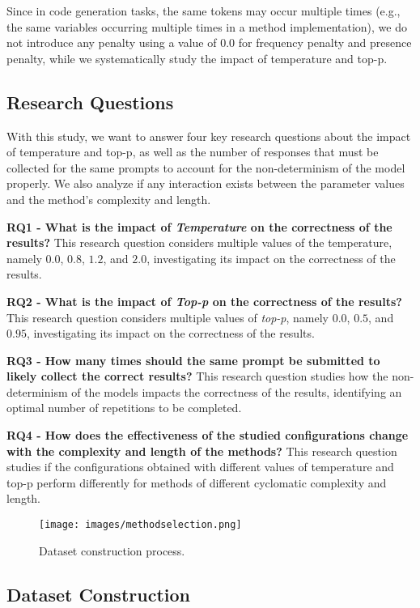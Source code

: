 Since in code generation tasks, the same tokens may occur multiple times (e.g., the same variables occurring multiple times in a method implementation), we do not introduce any penalty using a value of $0.0$ for frequency penalty and presence penalty, while we systematically study the impact of temperature and top-p.

\subsection{Research Questions} \label{sec:rq}

With this study, we want to answer four key research questions about the impact of temperature and top-p, as well as the number of responses that must be collected for the same prompts to account for the non-determinism of the model properly. We also analyze if any interaction exists between the parameter values and the method's complexity and length.

\textbf{RQ1 - What is the impact of \emph{Temperature} on the correctness of the results?} This research question considers multiple values of the temperature, namely $0.0$, $0.8$, $1.2$, and $2.0$, investigating its impact on the correctness of the results.

\textbf{RQ2 - What is the impact of \emph{Top-p} on the correctness of the results?} This research question considers multiple values of \emph{top-p}, namely $0.0$, $0.5$, and $0.95$, investigating its impact on the correctness of the results.


\textbf{RQ3 - How many times should the same prompt be submitted to likely collect the correct results?} This research question studies how the non-determinism of the models impacts the correctness of the results, identifying an optimal number of repetitions to be completed.

\textbf{RQ4 - How does the effectiveness of the studied configurations change with the complexity and length of the methods?} This research question studies if the configurations obtained with different values of temperature and top-p perform differently for methods of different cyclomatic complexity and length.


\begin{figure*}
\centering
\texttt{[image: images/methodselection.png]}
\caption{Dataset construction process.}
\label{fig:methodology}
\end{figure*}

\subsection{Dataset Construction} \label{ßec:dataset}

